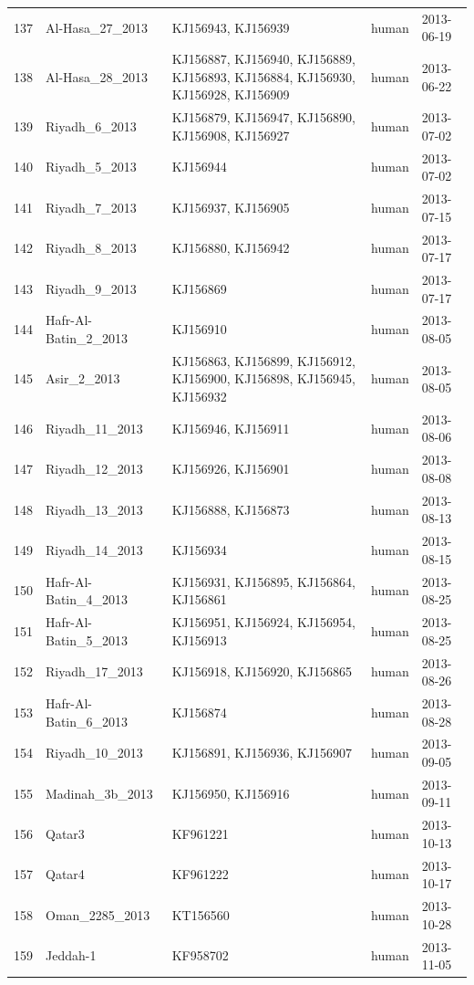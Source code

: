\documentclass[11pt,oneside,letterpaper]{article}
\begin{document}
\begin{longtable}{ | r | l | p{2cm} | l | l | }
  137 & Al-Hasa\_27\_2013 & KJ156943, KJ156939 & human & 2013-06-19 \\
  138 & Al-Hasa\_28\_2013 & KJ156887, KJ156940, KJ156889, KJ156893, KJ156884, KJ156930,
KJ156928, KJ156909 & human & 2013-06-22 \\
  139 & Riyadh\_6\_2013 & KJ156879, KJ156947, KJ156890, KJ156908, KJ156927 & human & 2013-07-02 \\
  140 & Riyadh\_5\_2013 & KJ156944 & human & 2013-07-02 \\
  141 & Riyadh\_7\_2013 & KJ156937, KJ156905 & human & 2013-07-15 \\
  142 & Riyadh\_8\_2013 & KJ156880, KJ156942 & human & 2013-07-17 \\
  143 & Riyadh\_9\_2013 & KJ156869 & human & 2013-07-17 \\
  144 & Hafr-Al-Batin\_2\_2013 & KJ156910 & human & 2013-08-05 \\
  145 & Asir\_2\_2013 & KJ156863, KJ156899, KJ156912, KJ156900, KJ156898, KJ156945,
KJ156932 & human & 2013-08-05 \\
  146 & Riyadh\_11\_2013 & KJ156946, KJ156911 & human & 2013-08-06 \\
  147 & Riyadh\_12\_2013 & KJ156926, KJ156901 & human & 2013-08-08 \\
  148 & Riyadh\_13\_2013 & KJ156888, KJ156873 & human & 2013-08-13 \\
  149 & Riyadh\_14\_2013 & KJ156934 & human & 2013-08-15 \\
  150 & Hafr-Al-Batin\_4\_2013 & KJ156931, KJ156895, KJ156864, KJ156861 & human & 2013-08-25 \\
  151 & Hafr-Al-Batin\_5\_2013 & KJ156951, KJ156924, KJ156954, KJ156913 & human & 2013-08-25 \\
  152 & Riyadh\_17\_2013 & KJ156918, KJ156920, KJ156865 & human & 2013-08-26 \\
  153 & Hafr-Al-Batin\_6\_2013 & KJ156874 & human & 2013-08-28 \\
  154 & Riyadh\_10\_2013 & KJ156891, KJ156936, KJ156907 & human & 2013-09-05 \\
  155 & Madinah\_3b\_2013 & KJ156950, KJ156916 & human & 2013-09-11 \\
  156 & Qatar3 & KF961221 & human & 2013-10-13 \\
  157 & Qatar4 & KF961222 & human & 2013-10-17 \\
  158 & Oman\_2285\_2013 & KT156560 & human & 2013-10-28 \\
  159 & Jeddah-1 & KF958702 & human & 2013-11-05 \\

\end{longtable}
\end{document}
